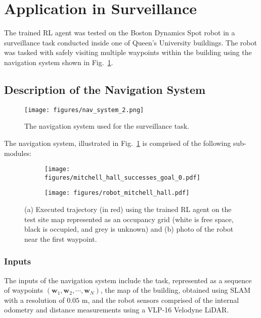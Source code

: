 \section{Application in Surveillance}
\label{sec:application}

The trained RL agent was tested on the Boston Dynamics Spot robot in a surveillance task conducted inside one of Queen's University buildings. The robot was tasked with safely visiting multiple waypoints within the building using the navigation system shown in Fig.~\ref{fig:navigation_system}.

\subsection{Description of the Navigation System}
\begin{figure}
    \centering
    \texttt{[image: figures/nav\_system\_2.png]}
    \caption{The navigation system used for the surveillance task.}
    \label{fig:navigation_system}
\end{figure}

The navigation system, illustrated in Fig.~\ref{fig:navigation_system} is comprised of the following sub-modules:

\begin{figure}
    \begin{subfigure}{1.0\linewidth}
    \centering
    \texttt{[image: figures/mitchell\_hall\_successes\_goal\_0.pdf]}
    \caption{}
    \label{fig:executed_path_a}
    \vspace{1em} 
    \end{subfigure}
    \begin{subfigure}{1.0\linewidth}
    \centering
    \texttt{[image: figures/robot\_mitchell\_hall.pdf]}
    \caption{}
    \label{fig:executed_path_b}
    \end{subfigure}
    \caption{(a) Executed trajectory (in red) using the trained RL agent on the test site map represented as an occupancy grid (white is free space, black is occupied, and grey is unknown) and (b) photo of the robot near the first waypoint.}
    \label{fig:executed_path}
\end{figure}

\subsubsection{Inputs}
The inputs of the navigation system include the task, represented as a sequence of waypoints $(\mathbf{w}_1,\mathbf{w}_2, \cdots, \mathbf{w}_N)$, the map of the building, obtained using SLAM with a resolution of $0.05$ m, and the robot sensors comprised of the internal odometry and distance measurements using a VLP-16 Velodyne LiDAR. 

